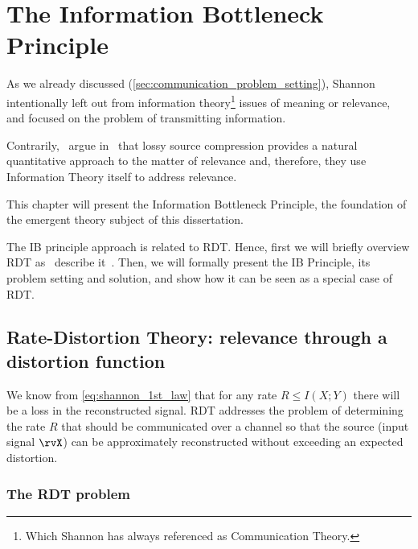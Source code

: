 

\chapter{The Information Bottleneck Principle}\label{ch:ib}


As we already discussed (\cref{sec:communication_problem_setting}), Shannon intentionally left out from information theory\footnote{Which Shannon has always referenced as Communication Theory.} issues of meaning or relevance, and focused on the problem of transmitting information.

Contrarily,~\citeauthor{tishby:1999} argue in~\cite{tishby:1999} that lossy source compression provides a natural quantitative approach to the matter of relevance and, therefore, they use Information Theory itself to address relevance.

This chapter will present the Information Bottleneck Principle, the foundation of the emergent theory subject of this dissertation.

The IB principle approach is related to \acf*{RDT}. Hence, first we will briefly overview RDT as~\citeauthor{tishby:1999} describe it~\cite{tishby:1999,slonim:2002}. Then, we will formally present the IB Principle, its problem setting and solution, and show how it can be seen as a special case of \acl{RDT}.

\section{Rate-Distortion Theory: relevance through a distortion function}\label{sec:RDT}
We know from \cref{eq:shannon_1st_law} that for any rate $R \leq I(X;Y)$ there will be a loss in the reconstructed signal. \acf*{RDT} addresses the problem of determining the rate $R$ that should be communicated over a channel so that the source (input signal $\rvX$) can be approximately reconstructed without exceeding an expected distortion.

\subsection{The \ac{RDT} problem}
